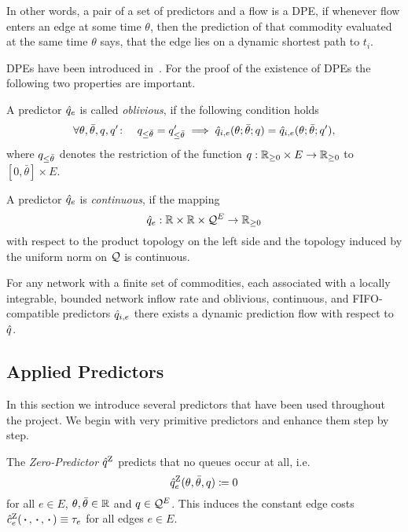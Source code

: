 In other words, a pair of a set of predictors and a flow is a DPE, if whenever flow enters an edge at some time $\theta$, then the prediction of that commodity evaluated at the same time $\theta$ says, that the edge lies on a dynamic shortest path to $t_i$.

DPEs have been introduced in~\cite{mainpaper}.
For the proof of the existence of DPEs the following two properties are important.

\begin{definition}
    A predictor $\hat q_{e}$  is called \emph{oblivious},
if the following condition holds
    \[
    \forall \theta,\bar\theta, q,q'\colon\quad
    q_{\leq \bar\theta} = q'_{\leq \bar\theta}
    \implies
    \hat q_{i,e}(\theta;\bar\theta;q)=\hat q_{i,e}(\theta;\bar\theta;q'),
    \]
    where $q_{\leq \bar\theta}$ denotes the restriction of the function $q: \mathbb{R}_{\geq 0} \times E \to \mathbb{R}_{\geq 0}$ to $[0,\bar\theta] \times E$.
\end{definition}
\begin{definition}
    A predictor $\hat q_{e}$ is \emph{continuous}, if the mapping 
    \[
        \hat q_{e}: \mathbb{R}\times \mathbb{R}\times \mathcal{Q}^E \rightarrow \mathbb{R}_{\geq0}
    \] with respect to the product topology on the left side and the topology induced by the uniform norm on $\mathcal{Q}$ is continuous.
\end{definition}

\begin{theorem}\label{thm:dpe-existence}
    For any network with a finite set of commodities, each associated with a locally integrable, bounded network inflow rate and oblivious, continuous, and FIFO-compatible predictors $\hat q_{i,e}$ there exists a dynamic prediction flow with respect to $\hat q$. 
\end{theorem}

\subsection{Applied Predictors}\label{sec:applied-predictors}

In this section we introduce several predictors that have been used throughout the project.
We begin with very primitive predictors and enhance them step by step.


The \emph{Zero-Predictor} $\hat q^{\text{Z}}$ predicts that no queues occur at all, i.e.\[
    \hat q^{\text{Z}}_{e}(\theta, \bar\theta, q) \coloneqq 0
\]
for all $e\in E$, $\theta,\bar\theta\in\mathbb{R}$ and $q\in \mathcal{Q}^E$.
This induces the constant edge costs $\hat c^{\text{Z}}_e(\,\boldsymbol{\cdot}\,, \,\boldsymbol{\cdot}\,, \,\boldsymbol{\cdot}\,)\equiv \tau_e$ for all edges $e\in E$.

